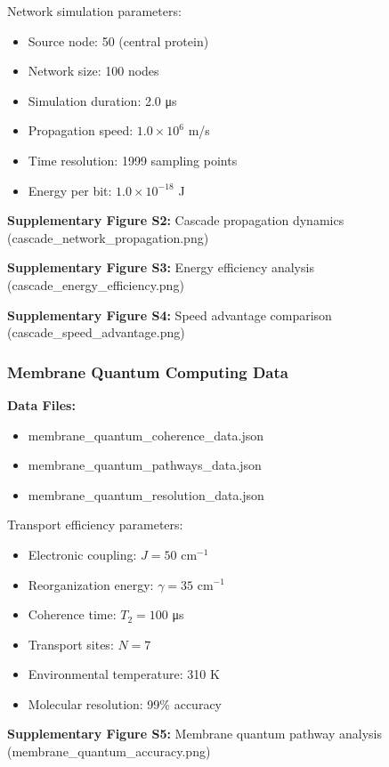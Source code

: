 Network simulation parameters:
\begin{itemize}
    \item Source node: 50 (central protein)  
    \item Network size: 100 nodes
    \item Simulation duration: 2.0 μs
    \item Propagation speed: $1.0 \times 10^6$ m/s
    \item Time resolution: 1999 sampling points
    \item Energy per bit: $1.0 \times 10^{-18}$ J
\end{itemize}

\textbf{Supplementary Figure S2:} Cascade propagation dynamics (cascade\_network\_propagation.png)

\textbf{Supplementary Figure S3:} Energy efficiency analysis (cascade\_energy\_efficiency.png)

\textbf{Supplementary Figure S4:} Speed advantage comparison (cascade\_speed\_advantage.png)

\subsubsection{Membrane Quantum Computing Data}

\textbf{Data Files:}
\begin{itemize}
    \item membrane\_quantum\_coherence\_data.json
    \item membrane\_quantum\_pathways\_data.json  
    \item membrane\_quantum\_resolution\_data.json
\end{itemize}

Transport efficiency parameters:
\begin{itemize}
    \item Electronic coupling: $J = 50$ cm$^{-1}$
    \item Reorganization energy: $\gamma = 35$ cm$^{-1}$
    \item Coherence time: $T_2 = 100$ μs
    \item Transport sites: $N = 7$ 
    \item Environmental temperature: 310 K
    \item Molecular resolution: 99\% accuracy
\end{itemize}

\textbf{Supplementary Figure S5:} Membrane quantum pathway analysis (membrane\_quantum\_accuracy.png)

